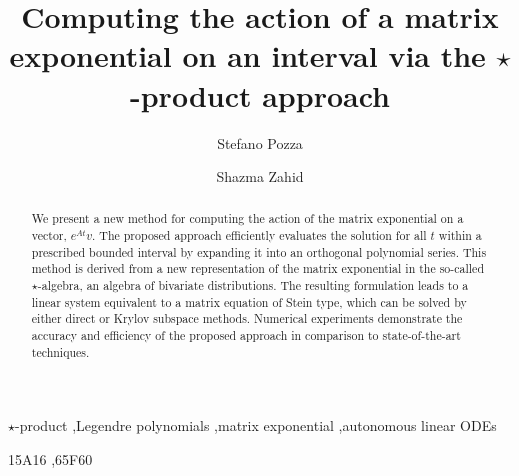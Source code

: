 \documentclass[final,1p,times,number]{elsarticle}
\theoremstyle{plain}%
\begin{document}

\begin{frontmatter}
\title{Computing the action of a matrix exponential on an interval via the $\star$-product approach}


\author[label1]{Stefano Pozza}
\author[label1]{Shazma Zahid}



\begin{abstract}
We present a new method for computing the action of the matrix exponential on a vector, \( e^{At}v \). 
The proposed approach efficiently evaluates the solution for all \( t \) within a prescribed bounded interval 
by expanding it into an orthogonal polynomial series. 
This method is derived from a new representation of the matrix exponential in the so-called \(\star\)-algebra, 
an algebra of bivariate distributions. 
The resulting formulation leads to a linear system equivalent to a matrix equation of Stein type, which can be solved by either direct or Krylov subspace methods. 
Numerical experiments demonstrate the accuracy and efficiency of the proposed approach in comparison to state-of-the-art techniques.
\end{abstract}

\begin{keyword}
$\star$-product \sep Legendre polynomials \sep matrix exponential \sep autonomous linear ODEs

\MSC[2020] 15A16 \sep 65F60
\end{keyword}

\end{frontmatter}
\end{document}
